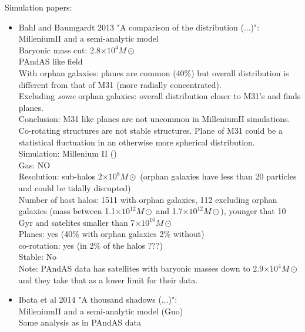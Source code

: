 \documentclass{emulateapj}
\begin{document}
Simulation papers:
\begin{itemize}
\item{Bahl and Baumgardt 2013 "A comparison of the distribution (...)":\\
MilleniumII and a semi-analytic model\\
Baryonic mass cut: 2.8$\times 10^4 M\odot$\\
PAndAS like field\\
With orphan galaxies: planes are common (40$\%$) but overall distribution is different from that of M31 (more radially concentrated).\\
Excluding \emph{some} orphan galaxies: overall distribution closer to M31's and finds planes.\\
Conclusion: M31 like planes are not uncommon in MilleniumII simulations. Co-rotating structures are not stable structures. Plane of M31 could be a statistical fluctuation in an otherwise more spherical distribution.\\
Simulation: Millenium II ()\\
Gas: NO\\
Resolution: sub-halos 2$\times 10^8 M\odot$ (orphan galaxies have less than 20 particles and could be tidally disrupted)\\
Number of host halos: 1511 with orphan galaxies, 112 excluding orphan galaxies (mass between 1.1$\times 10^{12} M\odot$ and 1.7$\times 10^{12} M\odot$), younger that 10 Gyr and satelites smaller than 7$\times 10^{10} M\odot$\\
Planes: yes (40$\%$ with orphan galaxies 2$\%$ without)\\
co-rotation: yes (in 2$\%$ of the halos ???)\\
Stable: No\\
Note: PAndAS data has satellites with baryonic masses down to 2.9$\times 10^{4} M\odot$ and they take that as a lower limit for their data.\\
}
\item{Ibata et al 2014 "A thousand shadows (...)":\\
MilleniumII and a semi-analytic model (Guo)\\
Same analysis as in PAndAS data\\
}
\end{itemize}
\end{document}
